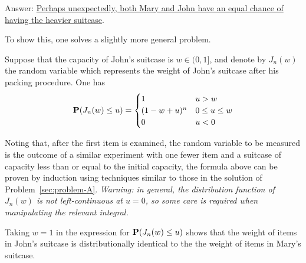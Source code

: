 \documentclass[british,a4paper]{article}
\begin{document}
Answer: \uline{Perhaps unexpectedly, both Mary and John have an equal chance of having the heavier suitcase}.

To show this, one solves a slightly more general problem.

Suppose that the capacity of John's suitcase is \(w \in (0, 1]\), and denote by \(J_n(w)\) the random variable which represents the weight of John's suitcase after his packing procedure. One has
\[
\operatorname{\mathbf{P}}(J_n(w) \leq u) =
\begin{cases}
1 & u > w\\
(1 - w + u)^n & 0 \leq u \leq w\\
0 & u < 0
\end{cases}
\]

Noting that, after the first item is examined, the random variable to be measured is the outcome of a similar experiment with one fewer item and a suitcase of capacity less than or equal to the initial capacity, the formula above can be proven by induction using techniques similar to those in the solution of Problem~\ref{sec:problem-A}. \emph{Warning: in general, the distribution function of \(J_n(w)\) is not left-continuous at \(u = 0\), so some care is required when manipulating the relevant integral.}

Taking \(w = 1\) in the expression for \(\operatorname{\mathbf{P}}(J_n(w) \leq u)\) shows that the weight of items in John's suitcase is distributionally identical to the the weight of items in Mary's suitcase.
\end{document}
